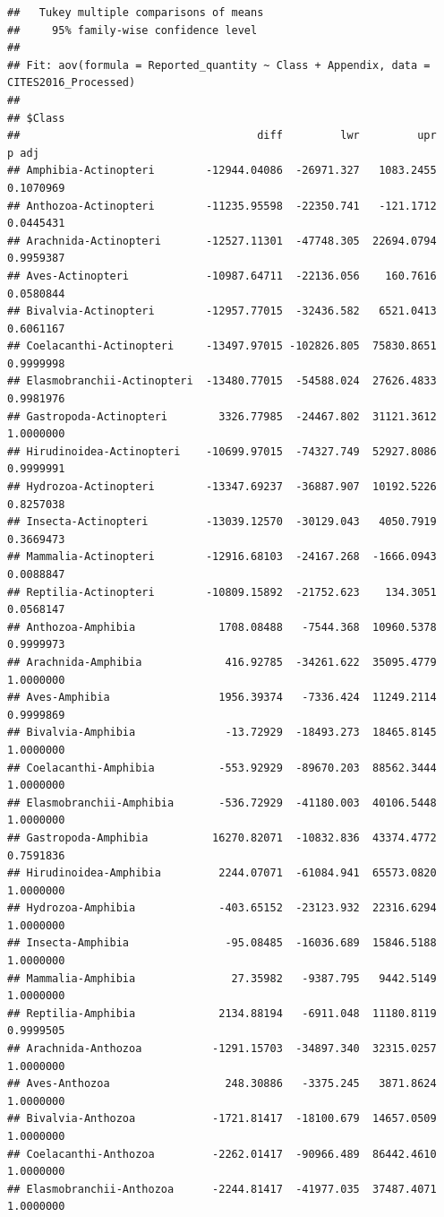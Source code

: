 \documentclass[
  12pt,
]{article}
\begin{document}
\begin{verbatim}
##   Tukey multiple comparisons of means
##     95% family-wise confidence level
## 
## Fit: aov(formula = Reported_quantity ~ Class + Appendix, data = CITES2016_Processed)
## 
## $Class
##                                     diff         lwr         upr     p adj
## Amphibia-Actinopteri        -12944.04086  -26971.327   1083.2455 0.1070969
## Anthozoa-Actinopteri        -11235.95598  -22350.741   -121.1712 0.0445431
## Arachnida-Actinopteri       -12527.11301  -47748.305  22694.0794 0.9959387
## Aves-Actinopteri            -10987.64711  -22136.056    160.7616 0.0580844
## Bivalvia-Actinopteri        -12957.77015  -32436.582   6521.0413 0.6061167
## Coelacanthi-Actinopteri     -13497.97015 -102826.805  75830.8651 0.9999998
## Elasmobranchii-Actinopteri  -13480.77015  -54588.024  27626.4833 0.9981976
## Gastropoda-Actinopteri        3326.77985  -24467.802  31121.3612 1.0000000
## Hirudinoidea-Actinopteri    -10699.97015  -74327.749  52927.8086 0.9999991
## Hydrozoa-Actinopteri        -13347.69237  -36887.907  10192.5226 0.8257038
## Insecta-Actinopteri         -13039.12570  -30129.043   4050.7919 0.3669473
## Mammalia-Actinopteri        -12916.68103  -24167.268  -1666.0943 0.0088847
## Reptilia-Actinopteri        -10809.15892  -21752.623    134.3051 0.0568147
## Anthozoa-Amphibia             1708.08488   -7544.368  10960.5378 0.9999973
## Arachnida-Amphibia             416.92785  -34261.622  35095.4779 1.0000000
## Aves-Amphibia                 1956.39374   -7336.424  11249.2114 0.9999869
## Bivalvia-Amphibia              -13.72929  -18493.273  18465.8145 1.0000000
## Coelacanthi-Amphibia          -553.92929  -89670.203  88562.3444 1.0000000
## Elasmobranchii-Amphibia       -536.72929  -41180.003  40106.5448 1.0000000
## Gastropoda-Amphibia          16270.82071  -10832.836  43374.4772 0.7591836
## Hirudinoidea-Amphibia         2244.07071  -61084.941  65573.0820 1.0000000
## Hydrozoa-Amphibia             -403.65152  -23123.932  22316.6294 1.0000000
## Insecta-Amphibia               -95.08485  -16036.689  15846.5188 1.0000000
## Mammalia-Amphibia               27.35982   -9387.795   9442.5149 1.0000000
## Reptilia-Amphibia             2134.88194   -6911.048  11180.8119 0.9999505
## Arachnida-Anthozoa           -1291.15703  -34897.340  32315.0257 1.0000000
## Aves-Anthozoa                  248.30886   -3375.245   3871.8624 1.0000000
## Bivalvia-Anthozoa            -1721.81417  -18100.679  14657.0509 1.0000000
## Coelacanthi-Anthozoa         -2262.01417  -90966.489  86442.4610 1.0000000
## Elasmobranchii-Anthozoa      -2244.81417  -41977.035  37487.4071 1.0000000

\end{verbatim}
\end{document}

